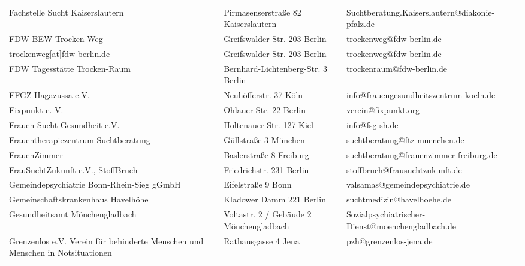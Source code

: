 {\begin{xltabular}{\textwidth} {
 >{\raggedright\arraybackslash}p{5cm}
 >{\raggedright\arraybackslash}X
 >{\raggedright\arraybackslash}p{5cm} }
Fachstelle Sucht Kaiserslautern & Pirmasenserstraße 82 Kaiserslautern & Suchtberatung.Kaiserslautern@diakonie-pfalz.de \\
FDW BEW Trocken-Weg & Greifswalder Str. 203 Berlin & trockenweg@fdw-berlin.de \\
trockenweg[at]fdw-berlin.de & Greifswalder Str. 203 Berlin & trockenweg@fdw-berlin.de \\
FDW Tagesstätte Trocken-Raum & Bernhard-Lichtenberg-Str. 3 Berlin & trockenraum@fdw-berlin.de \\
FFGZ Hagazussa e.V. & Neuhöfferstr. 37 Köln & info@frauengesundheitszentrum-koeln.de \\
Fixpunkt e. V. & Ohlauer Str. 22 Berlin & verein@fixpunkt.org \\
Frauen Sucht Gesundheit e.V. & Holtenauer Str. 127 Kiel & info@fsg-sh.de \\
Frauentherapiezentrum Suchtberatung & Güllstraße 3 München & suchtberatung@ftz-muenchen.de \\
FrauenZimmer & Baslerstraße 8 Freiburg & suchtberatung@frauenzimmer-freiburg.de \\
FrauSuchtZukunft e.V., StoffBruch & Friedrichstr. 231 Berlin & stoffbruch@frausuchtzukunft.de \\
Gemeindepsychiatrie Bonn-Rhein-Sieg gGmbH & Eifelstraße 9 Bonn & valsamas@gemeindepsychiatrie.de \\
Gemeinschaftskrankenhaus Havelhöhe & Kladower Damm 221 Berlin & suchtmedizin@havelhoehe.de \\
Gesundheitsamt Mönchengladbach & Voltastr. 2 / Gebäude 2 Mönchengladbach & Sozialpsychiatrischer-Dienst@moenchengladbach.de \\
Grenzenlos e.V. Verein für behinderte Menschen und Menschen in Notsituationen & Rathausgasse 4 Jena & pzh@grenzenlos-jena.de \\

\end{xltabular}}
